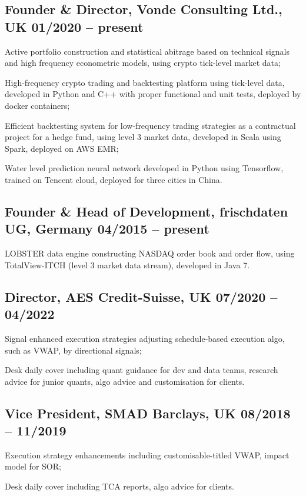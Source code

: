 \documentclass[a4paper,10pt]{article}
\begin{document}
\subsection{Founder \& Director, Vonde Consulting Ltd., UK \hfill 01/2020 -- present}
\begin{idesc}
\item[Active portfolio construction and statistical abitrage] based on technical signals and high frequency econometric models, using crypto tick-level market data; 
\item[High-frequency crypto trading and backtesting platform] using tick-level data, developed in Python and C++ with proper functional and unit tests, deployed by docker containers;
\item[Efficient backtesting system for low-frequency trading strategies] as a contractual project for a hedge fund, using level 3 market data, developed in Scala using Spark, deployed on AWS EMR;
\item[Water level prediction neural network] developed in Python using Tensorflow, trained on Tencent cloud, deployed for three cities in China.
\end{idesc}
\subsection{Founder \& Head of Development, frischdaten UG, Germany  \hfill 04/2015 -- present}
\begin{idesc}
    \item[LOBSTER data engine] constructing NASDAQ order book and order flow,  using TotalView-ITCH (level 3 market data stream), developed in Java 7.
\end{idesc}
\subsection{Director, AES Credit-Suisse, UK \hfill 07/2020 -- 04/2022}
\begin{idesc}
    \item[Signal enhanced execution strategies] adjusting schedule-based execution algo, such as VWAP, by directional signals;
    \item[Desk daily cover] including quant guidance for dev and data teams, research advice for junior quants, algo advice and customisation for clients. 
\end{idesc}
\subsection{Vice President, SMAD Barclays, UK \hfill 08/2018 -- 11/2019}
\begin{idesc}
\item[Execution strategy enhancements] including customisable-titled VWAP, impact model for SOR;
\item[Desk daily cover] including TCA reports, algo advice for clients.
\end{idesc}
\end{document}
